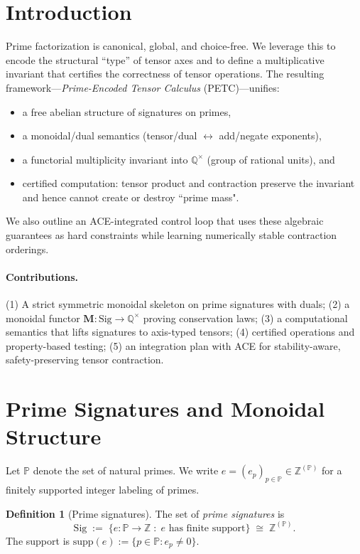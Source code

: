 \documentclass[11pt]{article}
\theoremstyle{plain}
\theoremstyle{definition}
\newtheorem{definition}[theorem]{Definition}
\newcommand{\Z}{\mathbb{Z}}
\newcommand{\Q}{\mathbb{Q}}
\newcommand{\PP}{\mathbb{P}} %
\newcommand{\Sig}{\mathrm{Sig}}
\newcommand{\supp}{\mathrm{supp}}
\newcommand{\M}{\mathbf{M}} %
\begin{document}
\section{Introduction}
\label{sec:intro}
Prime factorization is canonical, global, and choice-free. We leverage this to encode the structural ``type'' of tensor axes and to define a multiplicative invariant that certifies the correctness of tensor operations. The resulting framework---\emph{Prime-Encoded Tensor Calculus} (PETC)---unifies:
\begin{itemize}[leftmargin=*]
  \item a free abelian structure of signatures on primes,
  \item a monoidal/dual semantics (tensor/dual $\leftrightarrow$ add/negate exponents),
  \item a functorial multiplicity invariant into $\Q^{\times}$ (group of rational units), and
  \item certified computation: tensor product and contraction preserve the invariant and hence cannot create or destroy ``prime mass".
\end{itemize}
We also outline an ACE-integrated control loop that uses these algebraic guarantees as hard constraints while learning numerically stable contraction orderings.

\paragraph{Contributions.}
(1) A strict symmetric monoidal skeleton on prime signatures with duals; (2) a monoidal functor $\M:\Sig\to\Q^{\times}$ proving conservation laws; (3) a computational semantics that lifts signatures to axis-typed tensors; (4) certified operations and property-based testing; (5) an integration plan with ACE for stability-aware, safety-preserving tensor contraction.

\section{Prime Signatures and Monoidal Structure}
\label{sec:signatures}
Let $\PP$ denote the set of natural primes. We write $e=(e_p)_{p\in\PP}\in \Z^{(\PP)}$ for a finitely supported integer labeling of primes.

\begin{definition}[Prime signatures]
The set of \emph{prime signatures} is
\[
  \Sig \;:=\; \{ e:\PP\to\Z \;:\; e \text{ has finite support}\}\;\cong\;\Z^{(\PP)}.
\]
The support is $\supp(e):=\{p\in\PP: e_p\neq 0\}$.
\end{definition}
\end{document}
